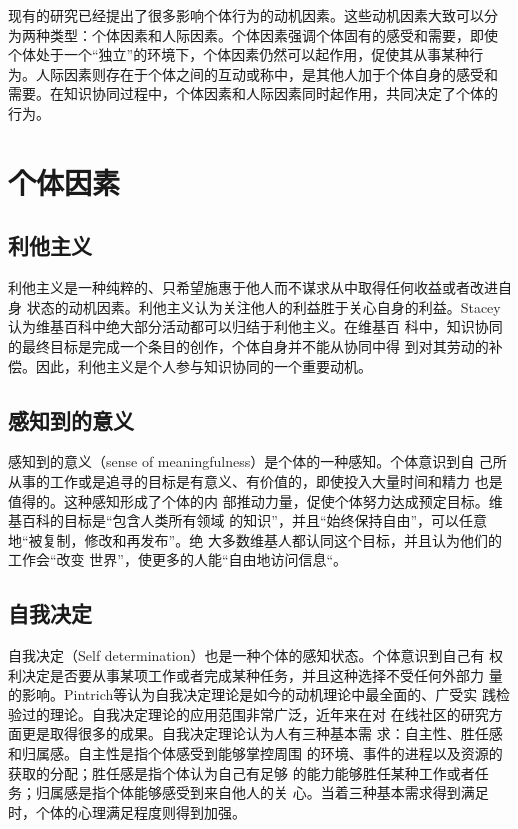 现有的研究已经提出了很多影响个体行为的动机因素。这些动机因素大致可以分
为两种类型：个体因素和人际因素。个体因素强调个体固有的感受和需要，即使
个体处于一个“独立”的环境下，个体因素仍然可以起作用，促使其从事某种行
为。人际因素则存在于个体之间的互动或称中，是其他人加于个体自身的感受和
需要。在知识协同过程中，个体因素和人际因素同时起作用，共同决定了个体的
行为。

\section{个体因素}
\label{sec:individual-factor}

\subsection{利他主义}
\label{sec:altruism}

利他主义是一种纯粹的、只希望施惠于他人而不谋求从中取得任何收益或者改进自身
状态的动机因素。利他主义认为关注他人的利益胜于关心自身的利益。Stacey认为维基百科中绝大部分活动都可以归结于利他主义。在维基百
科中，知识协同的最终目标是完成一个条目的创作，个体自身并不能从协同中得
到对其劳动的补偿。因此，利他主义是个人参与知识协同的一个重要动机。

\subsection{感知到的意义}
\label{sec:sense-of-meaning}

感知到的意义（sense of meaningfulness）是个体的一种感知。个体意识到自
己所从事的工作或是追寻的目标是有意义、有价值的，即使投入大量时间和精力
也是值得的。这种感知形成了个体的内
部推动力量，促使个体努力达成预定目标。维基百科的目标是“包含人类所有领域
的知识”，并且“始终保持自由”，可以任意地“被复制，修改和再发布”。绝
大多数维基人都认同这个目标，并且认为他们的工作会“改变
世界”，使更多的人能“自由地访问信息“。

\subsection{自我决定}
\label{sec:self-determination}

自我决定（Self determination）也是一种个体的感知状态。个体意识到自己有
权利决定是否要从事某项工作或者完成某种任务，并且这种选择不受任何外部力
量的影响。Pintrich等认为自我决定理论是如今的动机理论中最全面的、广受实
践检验过的理论。自我决定理论的应用范围非常广泛，近年来在对
在线社区的研究方面更是取得很多的成果。自我决定理论认为人有三种基本需
求：自主性、胜任感和归属感。自主性是指个体感受到能够掌控周围
的环境、事件的进程以及资源的获取的分配；胜任感是指个体认为自己有足够
的能力能够胜任某种工作或者任务；归属感是指个体能够感受到来自他人的关
心。当着三种基本需求得到满足时，个体的心理满足程度则得到加强。

